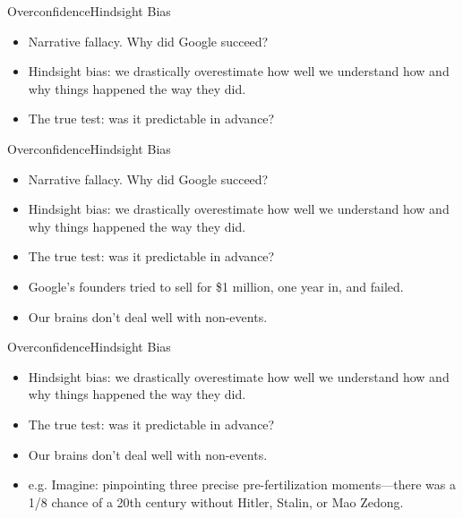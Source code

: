 \documentclass{beamer}
\begin{document}
\begin{frame}{Overconfidence}{Hindsight Bias}
\begin{itemize}
\addtolength{\itemsep}{0.5\baselineskip}
\item Narrative fallacy. Why did Google succeed?
\item Hindsight bias: we drastically overestimate how well we understand how and why things happened the way they did. 
\item The true test: was it predictable in advance?
\end{itemize}
\end{frame}

\begin{frame}{Overconfidence}{Hindsight Bias}
\begin{itemize}
\addtolength{\itemsep}{0.5\baselineskip}
\item Narrative fallacy. Why did Google succeed?
\item Hindsight bias: we drastically overestimate how well we understand how and why things happened the way they did. 
\item The true test: was it predictable in advance?
\item Google's founders tried to sell for \$1 million, one year in, and failed.
\item Our brains don't deal well with non-events.
\end{itemize}
\end{frame}

\begin{frame}{Overconfidence}{Hindsight Bias}
\begin{itemize}
\addtolength{\itemsep}{0.5\baselineskip}
\item Hindsight bias: we drastically overestimate how well we understand how and why things happened the way they did. 
\item The true test: was it predictable in advance?
\item Our brains don't deal well with non-events.
\item e.g. Imagine: pinpointing three precise pre-fertilization moments---there was a 1/8 chance of a 20th century without Hitler, Stalin, or Mao Zedong. 
\end{itemize}
\end{frame}
\end{document}
